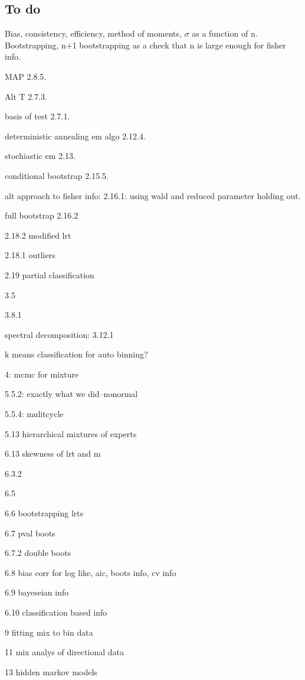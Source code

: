 \documentclass[12pt]{amsart}
\begin{document}
\subsection{To do}
Bias, consistency, efficiency, method of moments, $\sigma$ as a function of n. Bootstrapping, n+1 bootstrapping as a check that n is large enough for fisher info.


MAP 2.8.5.

Alt T 2.7.3.

basis of test 2.7.1.

deterministic annealing em algo 2.12.4.

stochiastic em 2.13.

conditional bootstrap 2.15.5. 


alt approach to fisher info: 2.16.1: using wald and reduced parameter holding out.

full bootstrap 2.16.2



2.18.2 modified lrt

2.18.1 outliers

2.19 partial classification

3.5

3.8.1


spectral decomposition: 3.12.1

k means classification for auto binning?

4: mcmc for mixture

5.5.2: exactly what we did--nonormal

5.5.4: mulitcycle

5.13 hierarchical mixtures of experts


6.13 skewness of lrt and m

6.3.2

6.5

6.6 bootstrapping lrts

6.7 pval boots

6.7.2 double boots

6.8 bias corr for log like, aic, boots info, cv info

6.9 bayeseian info

6.10 classification based info

9 fitting mix to bin data

11 mix analys of directional data

13 hidden markov models
\end{document}
